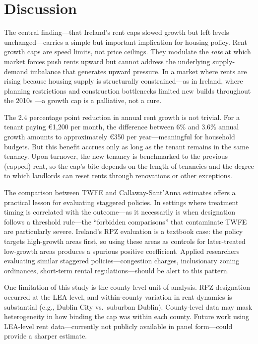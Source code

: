 \documentclass[12pt]{article}
\begin{document}
\section{Discussion}
\label{sec:discussion}

The central finding---that Ireland's rent caps slowed growth but left levels unchanged---carries a simple but important implication for housing policy. Rent growth caps are speed limits, not price ceilings. They modulate the \textit{rate} at which market forces push rents upward but cannot address the underlying supply-demand imbalance that generates upward pressure. In a market where rents are rising because housing supply is structurally constrained---as in Ireland, where planning restrictions and construction bottlenecks limited new builds throughout the 2010s \citep{lyons2019,ohanlon2021}---a growth cap is a palliative, not a cure.

The 2.4 percentage point reduction in annual rent growth is not trivial. For a tenant paying \euro{1,200} per month, the difference between 6\% and 3.6\% annual growth amounts to approximately \euro{350} per year---meaningful for household budgets. But this benefit accrues only as long as the tenant remains in the same tenancy. Upon turnover, the new tenancy is benchmarked to the previous (capped) rent, so the cap's bite depends on the length of tenancies and the degree to which landlords can reset rents through renovations or other exceptions.

The comparison between TWFE and Callaway-Sant'Anna estimates offers a practical lesson for evaluating staggered policies. In settings where treatment timing is correlated with the outcome---as it necessarily is when designation follows a threshold rule---the ``forbidden comparisons'' that contaminate TWFE are particularly severe. Ireland's RPZ evaluation is a textbook case: the policy targets high-growth areas first, so using these areas as controls for later-treated low-growth areas produces a spurious positive coefficient. Applied researchers evaluating similar staggered policies---congestion charges, inclusionary zoning ordinances, short-term rental regulations---should be alert to this pattern.

One limitation of this study is the county-level unit of analysis. RPZ designation occurred at the LEA level, and within-county variation in rent dynamics is substantial (e.g., Dublin City vs.\ suburban Dublin). County-level data may mask heterogeneity in how binding the cap was within each county. Future work using LEA-level rent data---currently not publicly available in panel form---could provide a sharper estimate.
\end{document}
